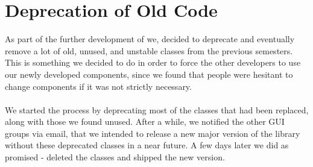 
\section{Deprecation of Old Code}
\label{sec:deprecation_of_old_code}

As part of the further development of \gc we, decided to deprecate and eventually remove a lot of old, unused, and unstable classes from the previous semesters. This is something we decided to do in order to force the other developers to use our newly developed components, since we found that people were hesitant to change components if it was not strictly necessary.
\\\\
We started the process by deprecating most of the classes that had been replaced, along with those we found unused. After a while, we notified the other GUI groups via email, that we intended to release a new major version of the \gc library without these deprecated classes in a near future. A few days later we did as promised - deleted the classes and shipped the new version.

